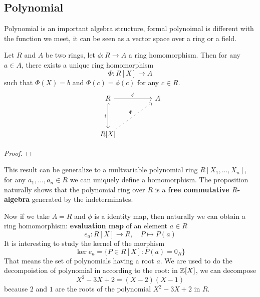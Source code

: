 \documentclass[en,geye,blue,normal,12pt]{elegantnote}
\begin{document}
\subsection{Polynomial}
Polynomial is an important algebra structure, formal polynoimal is different with the function we meet, it can be seen as a vector space over a ring or a field.

\begin{proposition}
Let \(R\) and \(A\) be two rings, let \(\phi: R \to A\) a ring homomorphism. Then for any \(a \in A \), there exists a unique ring homomorphism \[\Phi: R[X] \to A\] such that \(\Phi(X) = b\) and \(\Phi(c) = \phi(c)\) for any \(c \in R\).
\[\begin{tikzcd}
	R && A \\
	\\
	{R[X]}
	\arrow["\phi", from=1-1, to=1-3]
	\arrow["i"', hook, from=1-1, to=3-1]
	\arrow["\Phi", dotted, from=3-1, to=1-3]
\end{tikzcd}\]

\begin{proof}
  
\end{proof}
\end{proposition}
\begin{remark}
  This result can be generalize to a multvariable polynomial ring \(R[X_1,...,X_n]\), for any \(a_1,...,a_n \in R\) we can uniquely define a homomorphism. The proposition naturally shows that the polynomial ring over \(R\) is a \textbf{free commutative \(R\)-algebra} generated by the indeterminates.
\end{remark}

Now if we take \(A=R\) and \(\phi\) is a identity map, then naturally we can obtain a ring homomorphism: \textbf{evaluation map} of an element \(a \in R\)
\[e_a: R[X] \to R, \quad P \mapsto P(a)\]
It is interesting to study the kernel of the morphism
\[\ker e_a =  \{P \in R[X] : P(a) = 0_R\}\]
That means the set of polynomials having a root \(a\). We are used to do the decompoistion of polynomial in according to the root: in \(\mathbb{Z}[X]\), we can decompose 
\[X^2-3X+2 = (X-2)(X-1)\]
because \(2\) and \(1\) are the roots of the polynomial \(X^2-3X+2\) in \(R\). 
\end{document}
